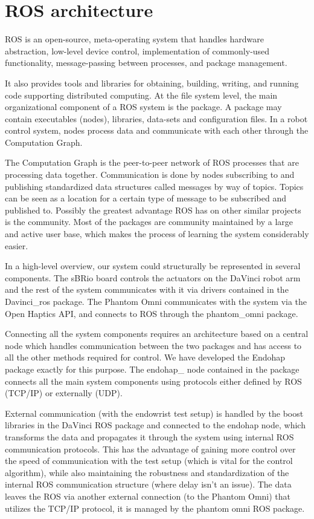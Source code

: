 \section{ROS architecture}\label{ros_architec}
ROS is an open-source, meta-operating system that handles
hardware abstraction, low-level device control, implementation
of commonly-used functionality, message-passing between
processes, and package management.

 It also provides tools and libraries for obtaining, building, writing, and running code supporting distributed computing. At the file system level, the main organizational component of a ROS system
is the package. A package may contain executables (nodes),
libraries, data-sets and configuration files. In a robot control
system, nodes process data and communicate with each other
through the Computation Graph.

The Computation Graph is the peer-to-peer network of ROS
processes that are processing data together. Communication
is done by nodes subscribing to and publishing standardized
data structures called messages by way of topics. Topics can
be seen as a location for a certain type of message to be
subscribed and published to. Possibly the greatest advantage
ROS has on other similar projects is the community. Most of
the packages are community maintained by a large and active
user base, which makes the process of learning the system
considerably easier.

In a high-level overview, our system could structurally be represented in several components.
The sBRio board controls the actuators on the DaVinci robot arm and the rest of the system communicates with it via drivers contained in the Davinci_ros package. The Phantom Omni communicates with the system via the Open Haptics API, and connects to ROS through the phantom_omni package.

Connecting all the system components requires an architecture based on a central node which handles communication between the two packages and has access to all the other methods required for control.
We have developed the Endohap package exactly for this purpose.
The endohap\_ node contained in the package connects all the main system components using protocols either defined by ROS (TCP/IP) or externally (UDP). 

External communication (with the endowrist test setup) is handled by the boost libraries in the DaVinci ROS package and connected to the endohap node, which transforms the data and propagates it through the system using internal ROS communication protocols. 
This has the advantage of gaining more control over the speed of communication with the test setup (which is vital for the control algorithm), while also maintaining the robustness and standardization of the internal ROS communication structure (where delay isn't an issue). The data leaves the ROS via another external connection (to the Phantom Omni) that utilizes the TCP/IP protocol, it is managed by the phantom omni ROS package.

